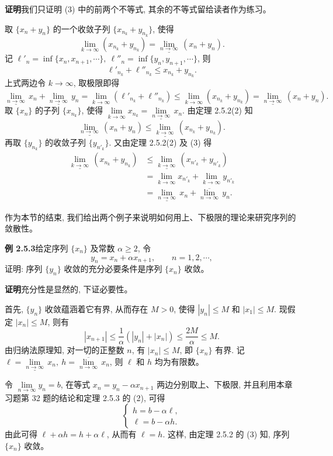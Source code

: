 \documentclass[UTF8, 12pt, fontset=fandol, oneside]{ctexart}
\begin{document}
\noindent\textbf{证明}\quad 我们只证明 (3) 中的前两个不等式, 其余的不等式留给读者作为练习。

取 $\{x_n+y_n\}$ 的一个收敛子列 $\{x_{n_k}+y_{n_k}\}$, 使得
\[
  \lim_{k\to\infty}(x_{n_k}+y_{n_k})
  =
  \underline{\lim_{n\to\infty}}\,(x_n+y_n).
\]
记 $\ell'_n=\inf\{x_n,x_{n+1},\cdots\},\ \ell''_n=\inf\{y_n,y_{n+1},\cdots\}$, 则
\[
  \ell'_{n_k}+\ell''_{n_k}\leqslant x_{n_k}+y_{n_k}.
\]
上式两边令 $k\to\infty$, 取极限即得
\[
  \underline{\lim_{n\to\infty}}\,x_n
  +
  \underline{\lim_{n\to\infty}}\,y_n
  =
  \lim_{k\to\infty}(\ell'_{n_k}+\ell''_{n_k})
  \leqslant
  \lim_{k\to\infty}(x_{n_k}+y_{n_k})
  =
  \underline{\lim_{n\to\infty}}\,(x_n+y_n).
\]
取 $\{x_n\}$ 的子列 $\{x_{n_k}\}$, 使得 $\lim\limits_{k\to\infty}x_{n_k}=\underline{\lim\limits_{n\to\infty}}\,x_n$. 由定理 2.5.2(2) 知
\[
  \underline{\lim_{n\to\infty}}\,(x_n+y_n)
  \leqslant
  \underline{\lim_{k\to\infty}}\,(x_{n_k}+y_{n_k}).
\]
再取 $\{y_{n_k}\}$ 的收敛子列 $\{y_{n'_k}\}$. 又由定理 2.5.2(2) 及 (3) 得
\[
\begin{aligned}
  \underline{\lim_{k\to\infty}}\,(x_{n_k}+y_{n_k})
  &\leqslant
  \underline{\lim_{k\to\infty}}\,(x_{n'_k}+y_{n'_k})\\
  &=
  \lim_{k\to\infty}x_{n'_k}+\lim_{k\to\infty}y_{n'_k}\\
  &=
  \underline{\lim_{n\to\infty}}\,x_n
  +
  \overline{\lim_{n\to\infty}}\,y_n.
\end{aligned}
\]

作为本节的结束, 我们给出两个例子来说明如何用上、下极限的理论来研究序列的敛散性。

\noindent\textbf{例 2.5.3}\quad 给定序列 $\{x_n\}$ 及常数 $\alpha\geqslant2$, 令
\[
  y_n=x_n+\alpha x_{n+1},\qquad n=1,2,\cdots,
\]
证明: 序列 $\{y_n\}$ 收敛的充分必要条件是序列 $\{x_n\}$ 收敛。

\noindent\textbf{证明}\quad 充分性是显然的, 下证必要性。

首先, $\{y_n\}$ 收敛蕴涵着它有界, 从而存在 $M>0$, 使得 $|y_n|\leqslant M$ 和 $|x_1|\leqslant M$. 现假定 $|x_n|\leqslant M$, 则有
\[
  |x_{n+1}|\leqslant\frac1\alpha(|y_n|+|x_n|)\leqslant\frac{2M}{\alpha}\leqslant M.
\]
由归纳法原理知, 对一切的正整数 $n$, 有 $|x_n|\leqslant M$, 即 $\{x_n\}$ 有界. 记 $\ell=\underline{\lim\limits_{n\to\infty}}\,x_n,\ h=\overline{\lim\limits_{n\to\infty}}\,x_n$, 则 $\ell$ 和 $h$ 均为有限数。

令 $\lim\limits_{n\to\infty}y_n=b$, 在等式 $x_n=y_n-\alpha x_{n+1}$ 两边分别取上、下极限, 并且利用本章习题第 32 题的结论和定理 2.5.3 的 (2), 可得
\[
  \begin{cases}
    h=b-\alpha\ell,\\
    \ell=b-\alpha h.
  \end{cases}
\]
由此可得 $\ell+\alpha h=h+\alpha\ell$, 从而有 $\ell=h$. 这样, 由定理 2.5.2 的 (3) 知, 序列 $\{x_n\}$ 收敛。
\end{document}
